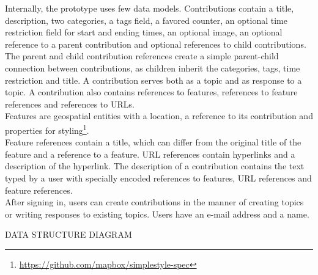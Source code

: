 \documentclass{sigchi}
\begin{document}
Internally, the prototype uses few data models. Contributions contain a title, description, two categories, a tags field, a favored counter, an optional time restriction field for start and ending times, an optional image, an optional reference to a parent contribution and optional references to child contributions. The parent and child contribution references create a simple parent-child connection between contributions, as children inherit the categories, tags, time restriction and title. A contribution serves both as a topic and as response to a topic. A contribution also contains references to features, references to feature references and references to URLs.\\
Features are geospatial entities with a location, a reference to its contribution and properties for styling\footnote{\url{https://github.com/mapbox/simplestyle-spec}}.\\
Feature references contain a title, which can differ from the original title of the feature and a reference to a feature. URL references contain hyperlinks and a description of the hyperlink. The description of a contribution contains the text typed by a user with specially encoded references to features, URL references and feature references.\\
After signing in, users can create contributions in the manner of creating topics or writing responses to existing topics. Users have an e-mail address and a name.

DATA STRUCTURE DIAGRAM
\end{document}
